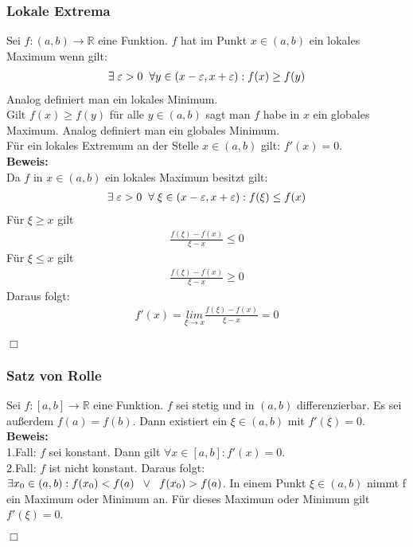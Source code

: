 \documentclass[a4paper]{article}
\begin{document}
\subsubsection{Lokale Extrema}
Sei $f: (a,b) \rightarrow \mathbb{R}$ eine Funktion. $f$ hat im Punkt $x \in (a,b)$ ein lokales Maximum wenn gilt:
\begin{align*}
\exists \hspace{0.1 cm}\varepsilon > 0 \hspace{0.2cm} \forall y \in (x-\varepsilon,x+\varepsilon): f(x) \geq f(y)
\end{align*}
Analog definiert man ein lokales Minimum. \\
Gilt $f(x) \geq f(y)$ für alle $y \in (a,b)$ sagt man $f$ habe in $x$ ein globales Maximum. Analog definiert man ein globales Minimum. \\
Für ein lokales Extremum an der Stelle $x \in (a,b)$ gilt: $f'(x)=0$. \\
\textbf{Beweis:}\\
Da $f$ in $x \in (a,b)$ ein lokales Maximum besitzt gilt:
\begin{align*}
\exists \hspace{0.1cm} \varepsilon > 0 \hspace{0.2cm} \forall \hspace{0.1cm} \xi \in (x-\varepsilon,x+\varepsilon): f(\xi) \leq f(x)
\end{align*}
Für $\xi \geq x$ gilt
\begin{align*}
\frac{f(\xi) - f(x)}{\xi - x} \leq 0
\end{align*}
Für $\xi \leq x$ gilt
\begin{align*}
\frac{f(\xi) - f(x)}{\xi - x} \geq 0
\end{align*}
Daraus folgt:
\begin{align*}
f'(x) = \underset{\xi \rightarrow x}{lim}\frac{f(\xi) - f(x)}{\xi - x} = 0
\end{align*}
\begin{flushright}
$\Box$
\end{flushright}
\subsubsection{Satz von Rolle}
Sei $f:[a,b] \rightarrow \mathbb{R}$ eine Funktion. $f$ sei stetig und in $(a,b)$ differenzierbar. Es sei außerdem $f(a)=f(b)$. Dann existiert ein $\xi \in (a,b)$ mit $f'(\xi)=0$. \vspace{1em}\\
\textbf{Beweis:} \\
1.Fall: $f$ sei konstant. Dann gilt $\forall x \in [a,b]: f'(x)=0$. \\
2.Fall: $f$ ist nicht konstant. Daraus folgt: $\exists x_0 \in (a,b): f(x_0) < f(a) \hspace{0.2cm} \lor \hspace{0.2cm} f(x_0) > f(a)$. In einem Punkt $\xi \in (a,b)$ nimmt f ein Maximum oder Minimum an. Für dieses Maximum oder Minimum gilt $f'(\xi)=0$. \\
\begin{flushright}
$\Box$
\end{flushright}
\end{document}
